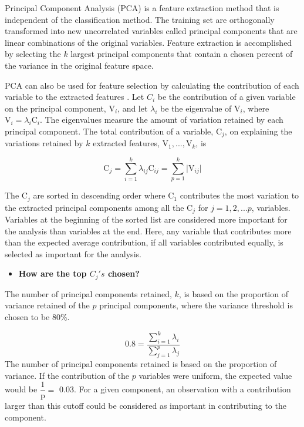 \documentclass[12pt,]{article}
\providecommand{\tightlist}{%
  \setlength{\itemsep}{0pt}\setlength{\parskip}{0pt}}
\begin{document}
Principal Component Analysis (PCA) \citep{f.r.s_liii._1901} is a feature
extraction method that is independent of the classification method. The
training set are orthogonally transformed into new uncorrelated
variables called principal components that are linear combinations of
the original variables. Feature extraction is accomplished by selecting
the \(k\) largest principal components that contain a chosen percent of
the variance in the original feature space.

PCA can also be used for feature selection by calculating the
contribution of each variable to the extracted features
\citep{song_feature_2010}. Let \(C_i\) be the contribution of a given
variable on the principal component, \(\text{V}_i\), and let
\(\lambda_i\) be the eigenvalue of \(\text{V}_i\), where
\(\text{V}_{i} = \lambda_i \text{C}_i\). The eigenvalues measure the
amount of variation retained by each principal component. The total
contribution of a variable, \(\text{C}_j\), on explaining the variations
retained by \(k\) extracted features, \(\text{V}_1, ..., \text{V}_k\),
is

\[
\text{C}_j = \sum^k_{i=1}\lambda_{ij} \text{C}_{ij} = \sum^k_{p=1} \vert \text{V}_{ij} \vert 
\]

The \(\text{C}_j\) are sorted in descending order where \(\text{C}_1\)
contributes the most variation to the extracted principal components
among all the \(\text{C}_j\) for \(j=1,2,...p\), variables. Variables at
the beginning of the sorted list are considered more important for the
analysis than variables at the end. Here, any variable that contributes
more than the expected average contribution, if all variables
contributed equally, is selected as important for the analysis.

\begin{itemize}
\tightlist
\item
  \textbf{How are the top \(C_j's\) chosen?}
\end{itemize}

The number of principal components retained, \(k\), is based on the
proportion of variance retained of the \(p\) principal components, where
the variance threshold is chosen to be 80\%.

\[
0.8 = \frac{\sum^k_{i=1} \lambda_i}{\sum^p_{j=1} \lambda_j}
\] The number of principal components retained is based on the
proportion of variance. If the contribution of the \(p\) variables were
uniform, the expected value would be \(\dfrac{1}{\text{p}} =\) 0.03. For
a given component, an observation with a contribution larger than this
cutoff could be considered as important in contributing to the
component.
\end{document}
